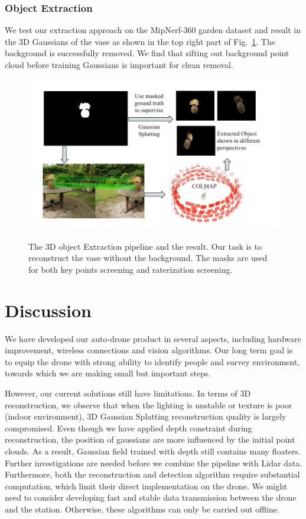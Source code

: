 \documentclass[conference]{IEEEtran}
\begin{document}
\subsubsection{Object Extraction}
We test our extraction approach on the MipNerf-360 garden dataset and result in the 3D Gaussians of the vase as shown in the top right part of Fig.~\ref{extraction}. The background is successfully removed. We find that sifting out background point cloud before training Gaussians is important for clean removal.
\begin{figure}[htbp]
    \centering
    \resizebox{9cm}{5cm}
    {\includegraphics{figures/Extraction.pdf}}
    \caption{The 3D object Extraction pipeline and the result. Our task is to reconstruct the vase without the background. The masks are used for both key points screening and raterization screening. }
    \label{extraction}
\end{figure}
\section{Discussion}
We have developed our auto-drone product in several aspects, including hardware improvement, wireless connections and vision algorithms. Our long term goal is to equip the drone with strong ability to identify people and survey environment, towards which we are making small but important steps. 

However, our current solutions still have limitations. In terms of 3D reconstruction, we observe that when the lighting is unstable or texture is poor (indoor environment), 3D Gaussian Splatting reconstruction quality is largely compromised. Even though we have applied depth constraint during reconstruction, the position of gaussians are more influenced by the initial point clouds. As a result, Gaussian field trained with depth still contains many floaters. Further investigations are needed before we combine the pipeline with Lidar data. Furthermore, both the reconstruction and detection algorithm require substantial computation, which limit their direct implementation on the drone. We might need to consider developing fast and stable data transmission between the drone and the station. Otherwise, these algorithms can only be carried out offline.
\end{document}
